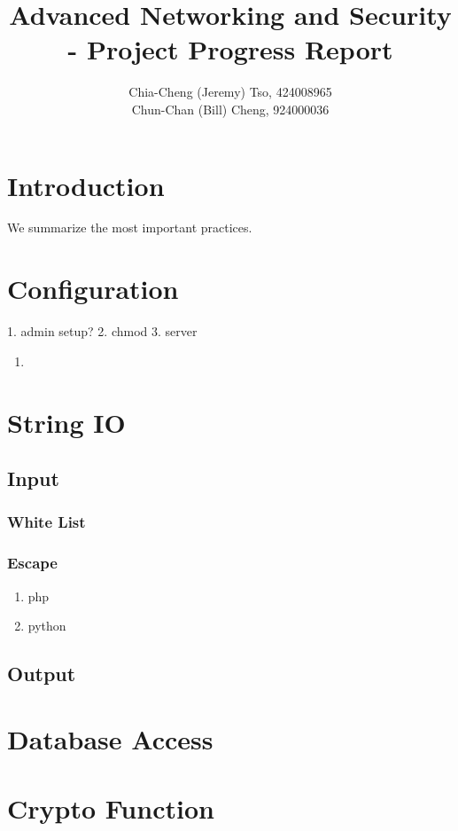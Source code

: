 \documentclass[12pt, a4paper]{article}
\title{
    Advanced Networking and Security\\
    - Project Progress Report 
    \vspace{-2ex}
}
\author{
    \normalfont \normalsize 
    Chia-Cheng (Jeremy) Tso, 
    424008965\\
    \normalfont \normalsize 
    Chun-Chan (Bill) Cheng, 
    924000036
}
\date{
    \normalfont \normalsize 
    \vspace{-5ex}
}
\begin{document}
\maketitle
\section{Introduction}
We summarize the most important practices.

\section{Configuration}
1. admin setup?
2. chmod
3. server
\begin{enumerate}[label=\textbf{\arabic*.}]
    \item
\end{enumerate}

\section{String IO}
\subsection{Input}
\subsubsection{White List}
\subsubsection{Escape}
\begin{enumerate}[label=\textbf{\arabic*.}]
    \item php
    \item python
\end{enumerate}

\subsection{Output}

\section{Database Access}

\section{Crypto Function}
\end{document}
